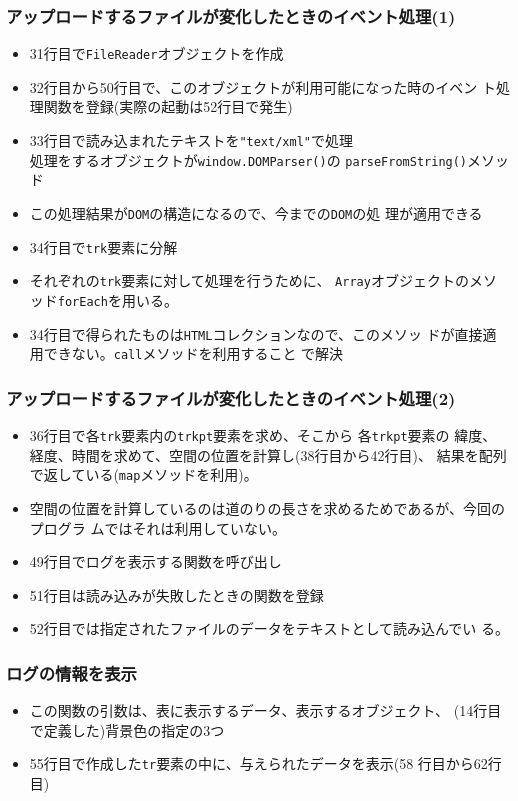 \begin{frame}[containsverbatim]
 \frametitle{アップロードするファイルが変化したときのイベント処理(1)}
 \begin{itemize}
	\item 31行目で\Verb+FileReader+オブジェクトを作成
	\item 32行目から50行目で、このオブジェクトが利用可能になった時のイベン
				ト処理関数を登録(実際の起動は52行目で発生)
	\item 33行目で読み込まれたテキストを\Verb+"text/xml"+で処理\\
        処理をするオブジェクトが\Verb+window.DOMParser()+の
				\Verb+parseFromString()+メソッド
	\item この処理結果が\Verb+DOM+の構造になるので、今までの\Verb+DOM+の処
				理が{適用}できる
	\item 34行目で\texttt{trk}要素に分解
	\item それぞれの\texttt{trk}要素に対して処理を行うために、
				\texttt{Array}オブジェクトのメソッド\texttt{forEach}を用いる。
	\item 34行目で得られたものは\texttt{HTML}コレクションなので、このメソッ
				ドが直接適用できない。\texttt{call}メソッドを利用すること
				で解決
 \end{itemize}
\end{frame}
\begin{frame}[containsverbatim]
 \frametitle{アップロードするファイルが変化したときのイベント処理(2)}
\begin{itemize}
	\item 36行目で各\texttt{trk}要素内の\texttt{trkpt}要素を求め、そこから
				各\texttt{trkpt}要素の
				緯度、経度、時間を求めて、空間の位置を計算し(38行目から42行目)、
				結果を配列で返している(\texttt{map}メソッドを利用)。
 \item 空間の位置を計算しているのは道のりの長さを求めるためであるが、今回のプログラ
				ムではそれは利用していない。
	\item 49行目でログを表示する関数を呼び出し
	\item 51行目は読み込みが失敗したときの関数を登録
	\item 52行目では指定されたファイルのデータをテキストとして読み込んでい
				る。
 \end{itemize}
\end{frame}
\begin{frame}[containsverbatim]
 \frametitle{ログの情報を表示}
\begin{itemize}
	\item この関数の引数は、表に表示するデータ、表示するオブジェクト、
				(14行目で定義した)背景色の指定の3つ
	\item 55行目で作成した\texttt{tr}要素の中に、与えられたデータを表示(58
				行目から62行目)
\end{itemize}
\end{frame}
